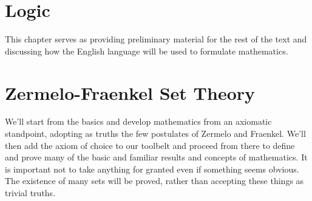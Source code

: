 \begingroup
    \ifcsname\PATH\endcsname
        \newcommand{\PATH}{books/Foundations/ZFC}
        \newcommand{\OLDPATH}{\PATH}
    \else
        \newcommand{\OLDPATH}{\PATH}
        \renewcommand{\PATH}{books/Foundations/ZFC}
    \fi
    \chapter{Logic}
        This chapter serves as providing preliminary material for the rest of
        the text and discussing how the English language will be used to
        formulate mathematics.
        
    \chapter{Zermelo-Fraenkel Set Theory}
        We'll start from the basics and develop mathematics from an axiomatic
        standpoint, adopting as truths the few postulates of Zermelo and
        Fraenkel. We'll then add the axiom of choice to our toolbelt and
        proceed from there to define and prove many of the basic and familiar
        results and concepts of mathematics. It is important not to take
        anything for granted even if something seems obvious. The existence of
        many sets will be proved, rather than accepting these things as trivial
        truths.
        
        

    \renewcommand{\PATH}{\OLDPATH}
\endgroup